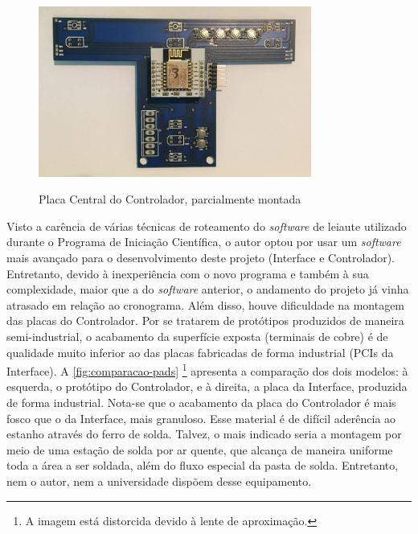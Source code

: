 \begin{figure}[H]
    \centering
    \caption{Placa Central do Controlador, parcialmente montada}
    \includegraphics[width=0.8\textwidth]{./dados/figuras/controlador-cen}
    \label{fig:controlador-cen}
\end{figure}

Visto a carência de várias técnicas de roteamento do \emph{software} de leiaute utilizado durante o Programa de Iniciação Científica, o autor optou por usar um \emph{software} mais avançado para o desenvolvimento deste projeto (Interface e Controlador). Entretanto, devido à inexperiência com o novo programa e também à sua complexidade, maior que a do \emph{software} anterior, o andamento do projeto já vinha atrasado em relação ao cronograma. Além disso, houve dificuldade na montagem das placas do Controlador. Por se tratarem de protótipos produzidos de maneira semi-industrial, o acabamento da superfície exposta (terminais de cobre) é de qualidade muito inferior ao das placas fabricadas de forma industrial (PCIs da Interface). A \autoref{fig:comparacao-pads} \footnote{A imagem está distorcida devido à lente de aproximação.} apresenta a comparação dos dois modelos: à esquerda, o protótipo do Controlador, e à direita, a placa da Interface, produzida de forma industrial. Nota-se que o acabamento da placa do Controlador é mais fosco que o da Interface, mais granuloso. Esse material é de difícil aderência ao estanho através do ferro de solda. Talvez, o mais indicado seria a montagem por meio de uma estação de solda por ar quente, que alcança de maneira uniforme toda a área a ser soldada, além do fluxo especial da pasta de solda. Entretanto, nem o autor, nem a universidade dispõem desse equipamento.

